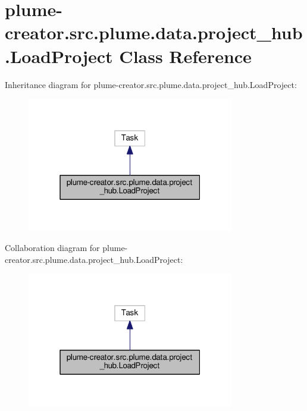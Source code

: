 \hypertarget{classplume-creator_1_1src_1_1plume_1_1data_1_1project__hub_1_1_load_project}{}\section{plume-\/creator.src.\+plume.\+data.\+project\+\_\+hub.\+Load\+Project Class Reference}
\label{classplume-creator_1_1src_1_1plume_1_1data_1_1project__hub_1_1_load_project}


Inheritance diagram for plume-\/creator.src.\+plume.\+data.\+project\+\_\+hub.\+Load\+Project\+:\nopagebreak
\begin{figure}[H]
\begin{center}
\leavevmode
\includegraphics[width=256pt]{classplume-creator_1_1src_1_1plume_1_1data_1_1project__hub_1_1_load_project__inherit__graph}
\end{center}
\end{figure}


Collaboration diagram for plume-\/creator.src.\+plume.\+data.\+project\+\_\+hub.\+Load\+Project\+:\nopagebreak
\begin{figure}[H]
\begin{center}
\leavevmode
\includegraphics[width=256pt]{classplume-creator_1_1src_1_1plume_1_1data_1_1project__hub_1_1_load_project__coll__graph}
\end{center}
\end{figure}
